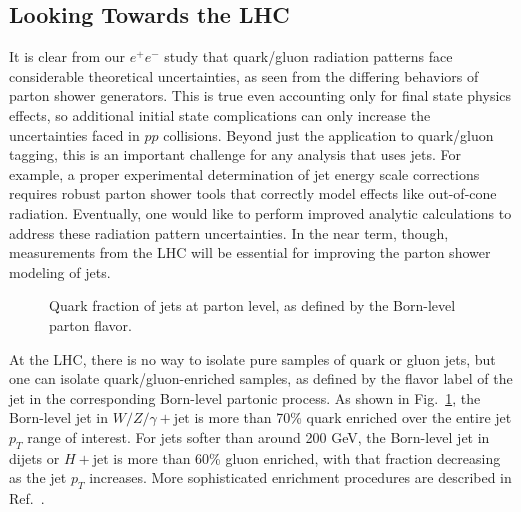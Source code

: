 \documentclass[11pt]{cernrep}
\begin{document}
\subsection{Looking Towards the LHC}
\label{quarkgluon_sec:pp}

It is clear from our $e^+e^-$ study that quark/gluon radiation patterns face considerable theoretical uncertainties, as seen from the differing behaviors of parton shower generators.  This is true even accounting only for final state physics effects, so additional initial state complications can only increase the uncertainties faced in $pp$ collisions.  Beyond just the application to quark/gluon tagging, this is an important challenge for any analysis that uses jets.  For example, a proper experimental determination of jet energy scale corrections requires robust parton shower tools that correctly model effects like out-of-cone radiation.  Eventually, one would like to perform improved analytic calculations to address these radiation pattern uncertainties.  In the near term, though, measurements from the LHC will be essential for improving the parton shower modeling of jets.

\begin{figure}
\centering
{}
\caption{Quark fraction of jets at parton level, as defined by the Born-level parton flavor.}
\label{quarkgluon_fig:parton_level_qg_composition}
\end{figure}

At the LHC, there is no way to isolate pure samples of quark or gluon jets, but one can isolate quark/gluon-enriched samples, as defined by the flavor label of the jet in the corresponding Born-level partonic process.  As shown in Fig.~\ref{quarkgluon_fig:parton_level_qg_composition}, the Born-level jet in $W/Z/\gamma + \text{jet}$ is more than 70\% quark enriched over the entire jet $p_T$ range of interest.  For jets softer than around 200 GeV, the Born-level jet in dijets or $H+\text{jet}$ is more than 60\% gluon enriched, with that fraction decreasing as the jet $p_T$ increases.  More sophisticated enrichment procedures are described in Ref.~\cite{Gallicchio:2011xc}.
\end{document}
